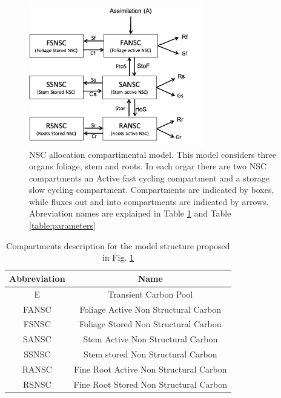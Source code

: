 \documentclass{article}
\begin{document}
\begin{figure}[h] %
   \centering
   \includegraphics[width=3in]{Fig_comp_model.png} 
   \caption{NSC allocation compartimental model. This model considers three organs foliage, stem and roots. In each orgar there are two NSC compartments an Active fast cycling compartment and a storage slow cycling compartment. Compartments are indicated by boxes, while fluxes out and into compartments are indicated by arrows. Abreviation names are explained in Table \ref{table:name_compartments} and  Table \ref{table:parameters}}
   \label{fig:comp_model}
\end{figure}  


\begin{table}[ht]
\caption{Compartments description for the model structure proposed in Fig. \ref{fig:comp_model}} %
\centering %
\begin{tabular}{cc}
\hline \hline
Abbreviation  & Name  \\
\hline
E & Transient Carbon Pool  \\
FANSC & Foliage Active Non Structural Carbon  \\
FSNSC & Foliage Stored Non Structural Carbon  \\
SANSC & Stem Active Non Structural Carbon  \\
SSNSC & Stem stored Non Structural Carbon  \\
RANSC & Fine Root Active Non Structural Carbon  \\
RSNSC & Fine Root Stored Non Structural Carbon  \\
\hline
\end{tabular}
\label{table:name_compartments} %
\end{table}
\end{document}

